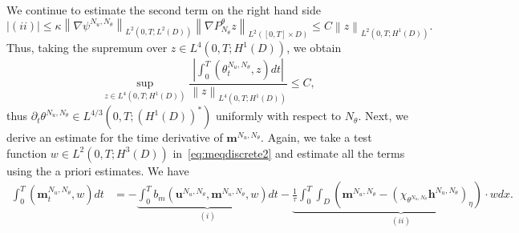 \documentclass[10pt,letterpaper,twoside]{amsart}
\theoremstyle{definition}{\newtheorem{definition}[lemma]{Definition}}
\theoremstyle{note}{\newtheorem{claim}{Claim}[section]
\newtheorem*{claim*}{Claim}}
\numberwithin{equation}{section}
\newcommand{\dom}{D}
\newcommand{\norm}[1]{\left\| #1 \right\|}
\newcommand{\Grad}{\nabla}
\newcommand{\bmb}{\mathbf{m}^{N_u,N_\theta}}
\newcommand{\bhb}{\mathbf{h}^{N_u,N_\theta}}
\newcommand{\bub}{\mathbf{u}^{N_u,N_\theta}}
\newcommand{\thb}{\theta^{N_u,N_\theta}}
\newcommand{\psib}{\psi^{N_u,N_\theta}}
\begin{document}
 We continue to estimate the second term on the right hand side
 \begin{equation*}
 	|(ii)| \leq \kappa \norm{\Grad\psib}_{L^2(0,T;L^2(\dom))}\norm{\Grad P_{N_\theta}^\theta z}_{L^2([0,T]\times\dom)}\leq C \norm{z}_{L^2(0,T;H^1(\dom))}.
 \end{equation*}
 Thus, taking the supremum over $z\in L^4(0,T;H^1(\dom))$, we obtain
 \begin{equation}\label{eq:timedertheta}
 	\sup_{z\in L^4(0,T;H^1(\dom))}\frac{ \left| \int_0^T (\thb_t,z) dt \right|}{\norm{z}_{L^4(0,T;H^1(\dom))}} \leq C,
 \end{equation}
 thus $\partial_t \thb\in L^{4/3}(0,T;(H^1(\dom))^*)$ uniformly with respect to   $N_\theta$. 
 Next, we derive an estimate for the time derivative of $\bmb$. Again, we take a test function $w\in L^2(0,T;H^3(\dom))$ in~\eqref{eq:meqdiscrete2} and estimate all the terms using the a priori estimates. We have
 \begin{align*}
 	\int_0^T (\bmb_t,w) dt & = -\underbrace{ \int_0^T b_m(\bub,\bmb,w) dt}_{(i)} -\underbrace{\frac{1}{\tau}\int_0^T\int_{\dom} (\bmb-(\chi_{\thb}\bhb)_\eta)\cdot w dx }_{(ii)}.
 \end{align*}
\end{document}
